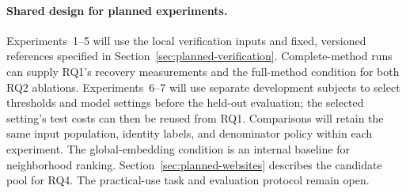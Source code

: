 \paragraph{Shared design for planned experiments.}
Experiments~1--5 will use the local verification inputs and fixed, versioned references specified in Section~\ref{sec:planned-verification}. Complete-method runs can supply RQ1's recovery measurements and the full-method condition for both RQ2 ablations. Experiments~6--7 will use separate development subjects to select thresholds and model settings before the held-out evaluation; the selected setting's test costs can then be reused from RQ1. Comparisons will retain the same input population, identity labels, and denominator policy within each experiment. The global-embedding condition is an internal baseline for neighborhood ranking. Section~\ref{sec:planned-websites} describes the candidate pool for RQ4. The practical-use task and evaluation protocol remain open.


